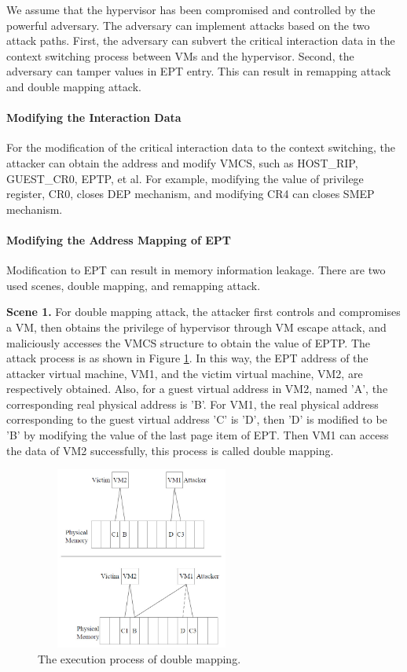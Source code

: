 \documentclass[conference]{IEEEtran}
\begin{document}

We assume that the hypervisor has been compromised and controlled by the powerful adversary. The adversary can implement attacks based on the two attack paths. 
First, the adversary can subvert the critical interaction data in the context switching process between VMs and the hypervisor. Second, the adversary can tamper values in EPT entry. This can result in remapping attack and double mapping attack.

\paragraph{Modifying the Interaction Data}
For the modification of the critical interaction data to the context switching, the attacker can obtain the address 
and modify VMCS, such as HOST\_RIP, GUEST\_CR0, EPTP, et al. For example,
modifying the value of privilege register, CR0, closes DEP mechanism, and modifying CR4 can closes SMEP mechanism.

\paragraph{Modifying the Address Mapping of EPT}
Modification to EPT can result in memory information leakage. There are two used scenes, double mapping, and remapping attack.

\textbf{Scene 1.} 
    For double mapping attack, the attacker first controls and compromises a VM, then obtains the privilege of hypervisor through VM escape attack, and maliciously accesses the VMCS structure to obtain the value of EPTP. The attack process is as shown in Figure \ref{fig0}. In this way, the EPT address of the attacker virtual machine, VM1, and the victim virtual machine, VM2, are respectively obtained. Also, for a guest virtual address in VM2, named 'A', the corresponding real physical address is 'B'. For VM1, the real physical address corresponding to the guest virtual address 'C' is 'D', then 'D' is modified to be 'B' by modifying the value of the last page item of EPT. Then VM1 can access the data of VM2 successfully, this process is called double mapping.

\begin{figure}
\centerline{\includegraphics[width=7cm, height=6cm]{VMCS0.jpg}}%
\caption{The execution process of double mapping. } \label{fig0}
\end{figure}
\end{document}
